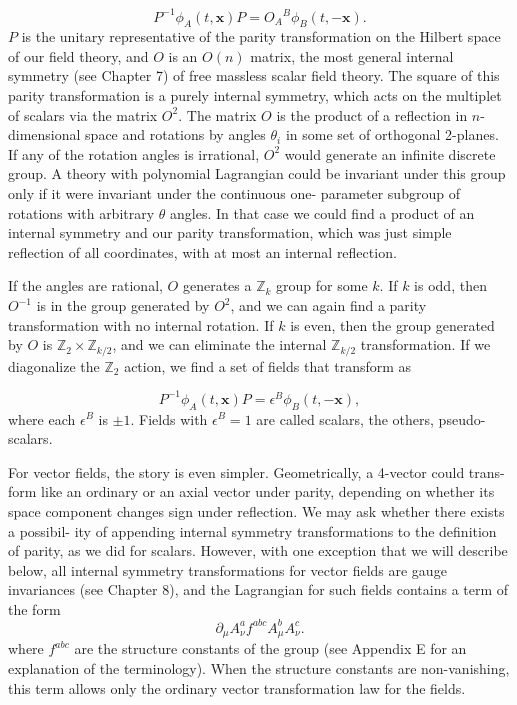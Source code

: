 \begin{equation}
  P^{-1}\phi_A(t,\mathbf{x})P=O_A{}^B\phi_B(t,-\mathbf{x}).
  \label{eq:5.3}
\end{equation}
$P$ is the unitary representative of the parity transformation on the Hilbert space of
our field theory, and $O$ is an $O(n)$ matrix, the most general internal symmetry (see
Chapter 7) of free massless scalar field theory. The square of this parity transformation
is a purely internal symmetry, which acts on the multiplet of scalars via the matrix $O^2$.
The matrix $O$ is the product of a reflection in $n$-dimensional space and rotations by
angles $\theta_i$ in some set of orthogonal 2-planes. If any of the rotation angles is irrational,
$O^2$ would generate an infinite discrete group. A theory with polynomial Lagrangian
could be invariant under this group only if it were invariant under the continuous one-
parameter subgroup of rotations with arbitrary $\theta$ angles. In that case we could find a
product of an internal symmetry and our parity transformation, which was just simple
reflection of all coordinates, with at most an internal reflection.

If the angles are rational, $O$ generates a $\mathbb Z_k$ group for some $k$. If $k$ is odd, then $O^{-1}$
is in the group generated by $O^2$, and we can again find a parity transformation with no
internal rotation. If $k$ is even, then the group generated by $O$ is $\mathbb Z_2\times\mathbb Z_{k/2}$, and we can
eliminate the internal $\mathbb Z_{k/2}$ transformation. If we diagonalize the $\mathbb Z_2$ action, we find a
set of fields that transform as

\begin{equation}
  P^{-1}\phi_A(t,\mathbf{x})P=\epsilon^B\phi_B(t,-\mathbf{x}),
  \label{eq:5.4}
\end{equation}
where each $\epsilon^B$ is $\pm1$. Fields with $\epsilon^B=1$ are called scalars, the others, pseudo-scalars.

For vector fields, the story is even simpler. Geometrically, a 4-vector could trans-
form like an ordinary or an axial vector under parity, depending on whether its space
component changes sign under reflection. We may ask whether there exists a possibil-
ity of appending internal symmetry transformations to the definition of parity, as we
did for scalars. However, with one exception that we will describe below, all internal
symmetry transformations for vector fields are gauge invariances (see Chapter 8), and
the Lagrangian for such fields contains a term of the form
\begin{equation*}
  \partial_\mu A_\nu^a f^{abc}A_\mu^b A_\nu^c.
\end{equation*}
where $f^{abc}$ are the structure constants of the group (see Appendix E for an explanation
of the terminology). When the structure constants are non-vanishing, this term allows
only the ordinary vector transformation law for the fields.

